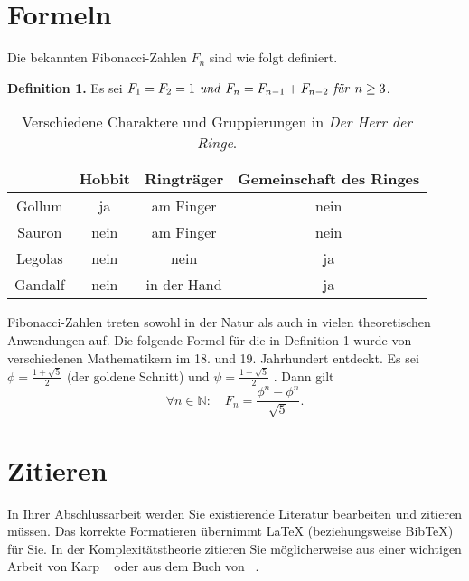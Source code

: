 \documentclass[a4paper]{article}
\begin{document}
		
	\section{Formeln}
	
	Die bekannten Fibonacci-Zahlen $F_n$ sind wie folgt definiert.\medskip
	
	
	\noindent \textbf{Definition 1.} Es sei $F_1=F_2=1 \text{\textit{ und }} F_n=F_{n-1}+F_{n-2} \text{\textit{ für }} n\geq3$.\bigskip

	\begin{table}[b]
		\centering
		\begin{tabular}{|c|c|c|c|}
			\hline
			& Hobbit & Ringträger & Gemeinschaft des Ringes \\
			\hline
			\hline
			Gollum & ja & am Finger & nein \\
			\hline
			Sauron & nein & am Finger & nein \\
			\hline
			Legolas & nein & nein & ja \\
			\hline
			Gandalf & nein & in der Hand & ja \\
			\hline	
		\end{tabular}	
		\caption{Verschiedene Charaktere und Gruppierungen in \textit{Der Herr der Ringe}.}
	\end{table}
	
	Fibonacci-Zahlen treten sowohl in der Natur als auch in vielen theoretischen Anwendungen auf. Die folgende Formel für die in Definition 1 wurde von verschiedenen Mathematikern im 18. und 19. Jahrhundert entdeckt. Es sei $\phi=\frac{1+\sqrt{5}}{2}$ (der goldene Schnitt) und $\psi=\frac{1-\sqrt{5}}{2}$ . Dann gilt
	\[\forall{n}\in\mathbb{N}:\quad F_n=\frac{\phi^n-\phi^n}{\sqrt{5}}\text{.}\] 
	
	
	

	
	\section{Zitieren}
    
	In Ihrer Abschlussarbeit werden Sie existierende Literatur bearbeiten und zitieren müssen. Das korrekte Formatieren übernimmt LaTeX (beziehungsweise BibTeX) für Sie. In der Komplexitätstheorie zitieren Sie möglicherweise aus einer wichtigen Arbeit von Karp ~\cite{2}  oder aus dem Buch von ~\cite{1}.
	
    
    
    
	
\end{document}
